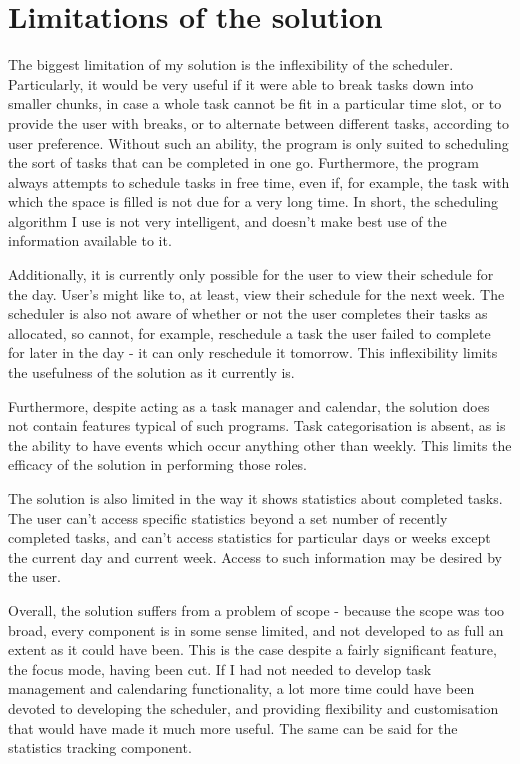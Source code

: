 \documentclass{article}
\begin{document}
\section{Limitations of the solution}
The biggest limitation of my solution is the inflexibility of the scheduler.
Particularly,
it would be very useful if it were able to break tasks down into smaller chunks,
in case a whole task cannot be fit in a particular time slot,
or to provide the user with breaks,
or to alternate between different tasks,
according to user preference.
Without such an ability,
the program is only suited to scheduling the sort of tasks that can be completed in one go.
Furthermore,
the program always attempts to schedule tasks in free time,
even if, for example,
the task with which the space is filled is not due for a very long time.
In short,
the scheduling algorithm I use is not very intelligent,
and doesn't make best use of the information available to it.

Additionally,
it is currently only possible for the user to view their schedule for the day.
User's might like to, at least, view their schedule for the next week.
The scheduler is also not aware of whether or not the user completes their tasks as allocated,
so cannot,
for example,
reschedule a task the user failed to complete for later in the day -
it can only reschedule it tomorrow.
This inflexibility limits the usefulness of the solution as it currently is.

Furthermore,
despite acting as a task manager and calendar,
the solution does not contain features typical of such programs.
Task categorisation is absent,
as is the ability to have events which occur anything other than weekly.
This limits the efficacy of the solution in performing those roles.

The solution is also limited in the way it shows statistics about completed tasks.
The user can't access specific statistics beyond a set number of recently completed tasks,
and can't access statistics for particular days or weeks except the current day and current week.
Access to such information may be desired by the user.

Overall,
the solution suffers from a problem of scope -
because the scope was too broad,
every component is in some sense limited,
and not developed to as full an extent as it could have been.
This is the case despite a fairly significant feature,
the focus mode,
having been cut.
If I had not needed to develop task management and calendaring functionality,
a lot more time could have been devoted to developing the scheduler,
and providing flexibility and customisation that would have made it much more useful.
The same can be said for the statistics tracking component.
\end{document}
